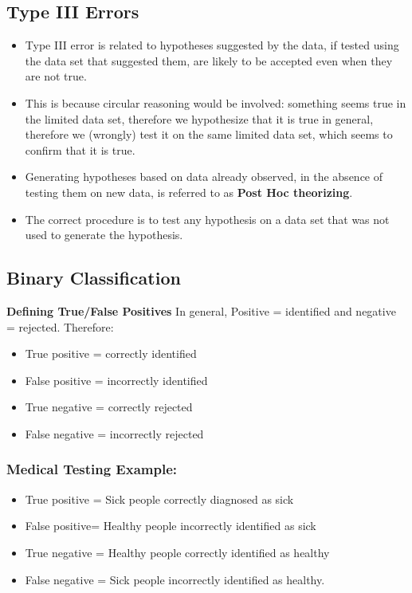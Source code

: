 \documentclass[a4paper,12pt]{article}
\begin{document}

\subsection*{Type III Errors}

\begin{itemize}
\item Type III error is related to hypotheses suggested by the data, if tested using the data set that suggested them, are likely to be accepted even when they are not true. 

\item This is because circular reasoning would be involved: something seems true in the limited data set, therefore we hypothesize that it is true in general, therefore we (wrongly) test it on the same limited data set, which seems to confirm that it is true. 

\item Generating hypotheses based on data already observed, in the absence of testing them on new data, is referred to as \textbf{Post Hoc theorizing}.


\item The correct procedure is to test any hypothesis on a data set that was not used to generate the hypothesis.
\end{itemize}
\newpage
\subsection{Binary Classification}
\noindent \textbf{Defining True/False Positives}
In general, Positive = identified and negative = rejected. Therefore:

\begin{itemize}
	\item True positive = correctly identified
	
	\item False positive = incorrectly identified
	
	\item True negative = correctly rejected
	
	\item False negative = incorrectly rejected
\end{itemize}
\subsubsection*{Medical Testing Example:}
\begin{itemize}
	\item True positive = Sick people correctly diagnosed as sick
	
	\item False positive= Healthy people incorrectly identified as sick
	
	\item True negative = Healthy people correctly identified as healthy
	
	\item False negative = Sick people incorrectly identified as healthy.
\end{itemize}
\newpage
\end{document}
